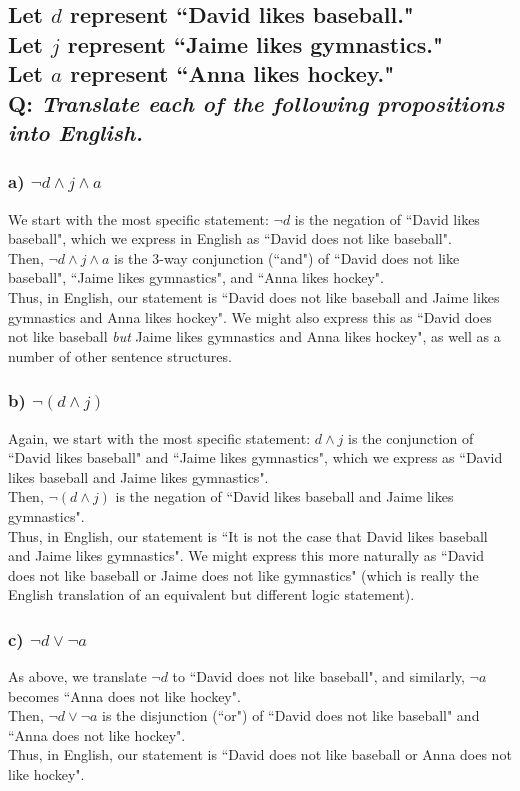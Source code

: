 \documentclass{article}
\begin{document}
\subsection*{{\normalsize Let $d$ represent ``David likes baseball."\\
Let $j$ represent ``Jaime likes gymnastics."\\
Let $a$ represent ``Anna likes hockey."}\\
Q: {\em Translate each of the following propositions into English.}}
\subsubsection*{a) $\neg d\wedge j\wedge a$}
We start with the most specific statement: $\neg d$ is the negation of ``David likes baseball", which we express in English as ``David does not like baseball".\\[1ex]
Then, $\neg d\wedge j\wedge a$ is the 3-way conjunction (``and") of ``David does not like baseball", ``Jaime likes gymnastics", and ``Anna likes hockey".\\[1ex]
Thus, in English, our statement is ``David does not like baseball and Jaime likes gymnastics and Anna likes hockey".
We might also express this as ``David does not like baseball \textit{but} Jaime likes gymnastics and Anna likes hockey", as well as a number of other sentence structures.

\subsubsection*{b) $\neg (d\wedge j)$}
Again, we start with the most specific statement: $d\wedge j$ is the conjunction of ``David likes baseball" and ``Jaime likes gymnastics", which we express as ``David likes baseball and Jaime likes gymnastics".\\[1ex]
Then, $\neg (d\wedge j)$ is the negation of ``David likes baseball and Jaime likes gymnastics".\\[1ex]
Thus, in English, our statement is ``It is not the case that David likes baseball and Jaime likes gymnastics".
We might express this more naturally as ``David does not like baseball or Jaime does not like gymnastics" (which is really the English translation of an equivalent but different logic statement).

\subsubsection*{c) $\neg d\vee\neg a$}
As above, we translate $\neg d$ to ``David does not like baseball", and similarly, $\neg a$ becomes ``Anna does not like hockey".\\[1ex]
Then, $\neg d\vee\neg a$ is the disjunction (``or") of ``David does not like baseball" and ``Anna does not like hockey".\\[1ex]
Thus, in English, our statement is ``David does not like baseball or Anna does not like hockey".
\end{document}
